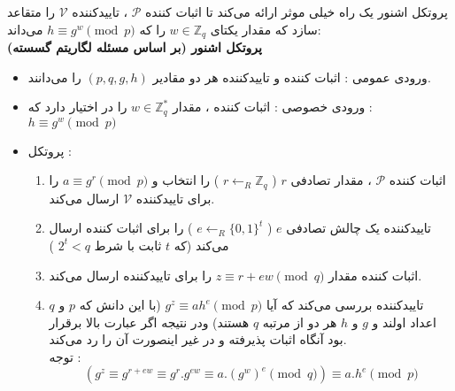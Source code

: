 \documentclass[12pt,a4paper]{article}
\begin{document}
  پروتکل اشنور یک راه خیلی موثر ارائه می‌کند تا اثبات کننده
  $\mathcal{P}$
  ، تاییدکننده 
 $\mathcal{V}$
 را متقاعد سازد که مقدار یکتای 
 $w \in \mathbb{Z}_q$
 را که 
 $h \equiv g^w \pmod{p}$
 می‌داند: \\
 
\textbf{پروتکل اشنور (بر اساس مسئله لگاریتم گسسته)} 

\begin{itemize}
	\item{ورودی عمومی : }
	اثبات کننده و تاییدکننده هر دو مقادیر 
	$(p,q,g,h)$
	را می‌دانند.
	\item {ورودی خصوصی : }
	اثبات کننده ، مقدار
	$w \in \mathbb{Z}_q^*$
	را در اختیار دارد که :
	$h \equiv g^w \pmod{p}$
	
	\item{پروتکل : }
	\begin{enumerate}
		\item 
		اثبات کننده 
		$\mathcal{P}$
		 ، مقدار تصادفی 
		 $r$
		 (
		 $r \leftarrow_R \mathbb{Z}_q$
		 )
		 را انتخاب و 
		 $a \equiv g^r \pmod{p}$
		 را برای تاییدکننده 
		  $\mathcal{V}$
		  ارسال می‌کند.
		  \item
		  تاییدکننده یک چالش تصادفی 
		  $e$
		  (
		 $e \leftarrow_R \{ 0,1 \}^t$
		  )
		  را برای اثبات کننده ارسال می‌کند (که 
		  $t$
		  ثابت با شرط 
		  $2^t < q$
		  )
		  
		  \item 
		  اثبات کننده مقدار 
		  $z \equiv r + ew \pmod{q }$
		  را برای تاییدکننده ارسال می‌کند.
		  \item 
		  تاییدکننده بررسی می‌کند که آیا 
		  $g^z \equiv ah^e \pmod{p}$
		  (با این دانش که 
		  $p$
		  و
		  $q$
		  اعداد اولند و 
		  $g$
		  و
		  $h$
		  هر دو از مرتبه 
		  $q$
		  هستند) ودر نتیجه اگر عبارت بالا برقرار بود آنگاه اثبات پذیرفته و در غیر اینصورت آن را رد می‌کند.\\
		  توجه :
		  $$ (g^z \equiv g^{r+ew} \equiv g^r.g^{ew} \equiv a.(g^w)^e \pmod{q }) \equiv 
				a.h^e \pmod{p}	 $$
		  
	\end{enumerate}
\end{itemize}




































\newpage
\setLTRbibitems


\end{document}
